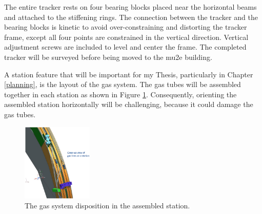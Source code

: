 The entire tracker rests on four bearing blocks placed near 
the horizontal beams and attached to the stiffening rings. 
The connection between the tracker and the bearing blocks is 
kinetic to avoid over-constraining and distorting the tracker 
frame, except all four points are constrained in the vertical 
direction. Vertical adjustment screws are included to level and center the frame. 
The completed tracker will be surveyed before being moved to the mu2e building. 

A station feature that will be important for my Thesis, particularly in 
Chapter \ref{planning}, is the layout of the gas system. 
The gas tubes will be assembled together in each station as shown in Figure 
\ref{fig:gassystem}. Consequently, orienting the assembled station horizontally 
will be challenging, because it could damage the gas tubes.

\begin{figure}[!h]
    \centering
    \includegraphics[width =0.3\textwidth]{figures/png/Screenshot_20240706_163631.png}
    \caption{The gas system disposition in the assembled station.}
    \label{fig:gassystem}
\end{figure}

